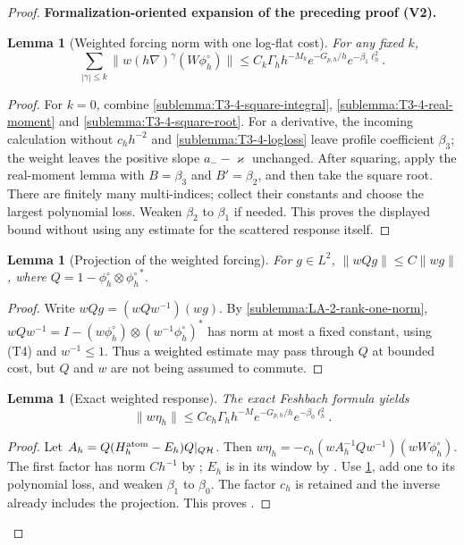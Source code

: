 \documentclass[11pt]{article}
\newtheorem{lemma}[theorem]{Lemma}
\newcommand{\formalisationparentid}{X}
\newenvironment{formalisationaddition}[1]{\par\medskip\begingroup\color{blue}\def\formalisationparentid{#1}\setcounter{formalizationsublemma}{0}\let\lemma\formalizationsublemma\let\endlemma\endformalizationsublemma
  \def\Eo{\mathcal E_h^\circ}\def\EE{\mathcal E_h}\def\phio{\phi_h^\circ}\def\phih{\phi_h}\def\Ho{H_h^{\rm atom}(v^\circ)}\def\Ha{H_h^{\rm atom}}\def\HL{H_h^{L}}\def\Dh{D_h}\def\Log{\operatorname{Log}}\def\ellh{\ell_h}\def\Gp{G_{p,h}}\def\Ast{A_{*,h}}\def\ahat{\widehat{\mathfrak a}_h}\def\ah{\mathfrak a_h}\def\rh{\widehat\rho_h}\def\deltah{\widehat\delta_h}\def\oldref##1{\textup{(##1)}}\def\interface##1{\par\noindent\textit{Analytical interface used here.} ##1\par}\def\finish{\par\noindent\textit{Conclusion of the formalization-oriented expansion.} }\par\noindent\textbf{Formalization-oriented expansion of the preceding proof (V2).}\par\smallskip
}{\par\endgroup\medskip
}
\begin{document}
\begin{proof}
\begin{formalisationaddition}{T3.4}
\begin{lemma}[Weighted forcing norm with one log-flat cost]\label{sublemma:T3-4-weighted-forcing}
For any fixed $k$,
\[
 \sum_{|\gamma|\le k}\|w(h\nabla)^\gamma(W\phio)\|
 \le C_k\Gamma_hh^{-M_k}e^{-G_{p,h}/h}e^{-\beta_1\ell_h^2}.
\]
\end{lemma}
\begin{proof}
For $k=0$, combine \ref{sublemma:T3-4-square-integral},
\ref{sublemma:T3-4-real-moment} and \ref{sublemma:T3-4-square-root}.
For a derivative, the incoming calculation without $c_hh^{-2}$ and
\ref{sublemma:T3-4-logloss} leave profile coefficient $\beta_3$;
the weight leaves the positive slope $a_--\varkappa$ unchanged.
After squaring, apply the real-moment lemma with $B=\beta_3$ and
$B'=\beta_2$, and then take the square root. There are finitely many
multi-indices; collect their constants and choose the largest polynomial
loss. Weaken $\beta_2$ to $\beta_1$ if needed. This proves the displayed
bound without using any estimate for the scattered response itself.
\end{proof}

\begin{lemma}[Projection of the weighted forcing]\label{sublemma:T3-4-weighted-projection}
For $g\in L^2$,
$\|wQg\|\le C\|wg\|$, where $Q=1-\phio\otimes{\phio}^*$.
\end{lemma}
\begin{proof}
Write $wQg=(wQw^{-1})(wg)$.
By \ref{sublemma:LA-2-rank-one-norm},
$wQw^{-1}=I-(w\phio)\otimes(w^{-1}\phio)^*$ has norm at most a fixed
constant, using (T4) and $w^{-1}\le1$.
Thus a weighted estimate may pass through $Q$ at bounded cost, but
$Q$ and $w$ are not being assumed to commute.
\end{proof}

\begin{lemma}[Exact weighted response]\label{sublemma:T3-4-weighted-response}
The exact Feshbach formula yields
\[
 \|w\eta_h\|\le Cc_h\Gamma_hh^{-M}e^{-G_{p,h}/h}
                              e^{-\beta_0\ell_h^2}.
\]
\end{lemma}
\begin{proof}
Let $A_h=Q(\Ha-E_h)Q|_{Q\mathcal H}$. Then
$w\eta_h=-c_h(wA_h^{-1}Qw^{-1})(wW\phio)$.
The first factor has norm $Ch^{-1}$ by ;
$E_h$ is in its window by .
Use \ref{sublemma:T3-4-weighted-forcing}, add one to its polynomial
loss, and weaken $\beta_1$ to $\beta_0$.
The factor $c_h$ is retained and the inverse already includes the
projection. This proves .
\end{proof}


\end{formalisationaddition}
\end{proof}
\end{document}
